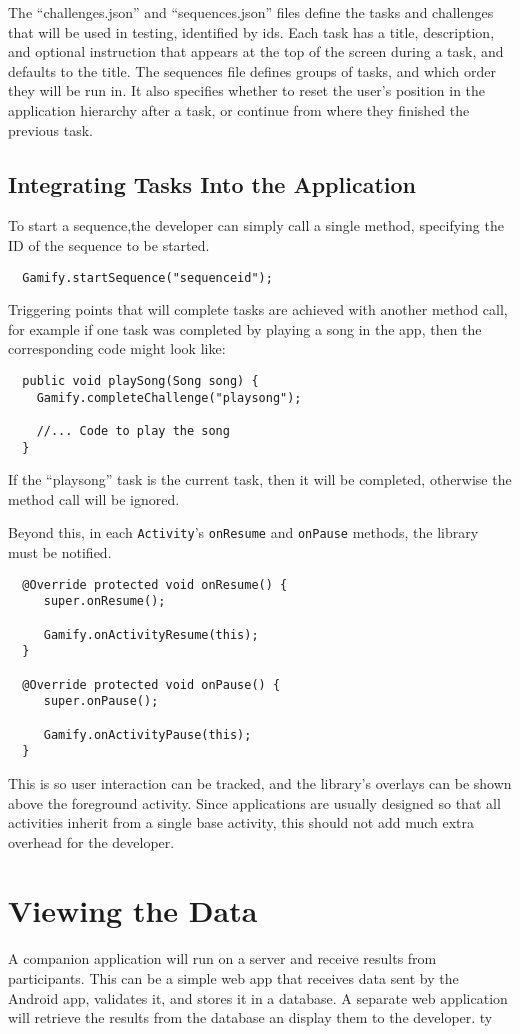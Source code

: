 The ``challenges.json'' and ``sequences.json'' files define the tasks and
challenges that will be used in testing, identified by ids. Each task has a title, description, and optional instruction that appears at the top of the screen during a task, and defaults to the title. The sequences file defines groups of tasks, and which order they will be run in. It also specifies whether to reset the user's position in the application hierarchy after a task, or continue from where they finished the previous task.

\subsection{Integrating Tasks Into the Application}

To start a sequence,the developer can simply call a single method, specifying the ID of the sequence
to be started.

\begin{verbatim}
  Gamify.startSequence("sequenceid");
\end{verbatim}

Triggering points that will complete tasks are achieved with another method
call, for example if one task was completed by playing a song in the app, then
the corresponding code might look like:

\begin{verbatim}
  public void playSong(Song song) {
    Gamify.completeChallenge("playsong");

    //... Code to play the song
  }
\end{verbatim}

If the ``playsong'' task is the current task, then it will be completed,
otherwise the method call will be ignored.

Beyond this, in each \verb|Activity|'s \verb|onResume| and \verb|onPause|
methods, the library must be notified.

\begin{verbatim}
  @Override protected void onResume() {
     super.onResume();

     Gamify.onActivityResume(this);
  }

  @Override protected void onPause() {
     super.onPause();

     Gamify.onActivityPause(this);
  }
\end{verbatim}

This is so user interaction can be tracked, and the library's overlays can be
shown above the foreground activity. Since applications are usually designed so
that all activities inherit from a single base activity, this should not add
much extra overhead for the developer.

\section{Viewing the Data}

A companion application will run on a server and receive results from
participants. This can be a simple web app that receives data sent by the
Android app, validates it, and stores it in a database.  A separate web
application will retrieve the results from the database an display them to the
developer.
ty